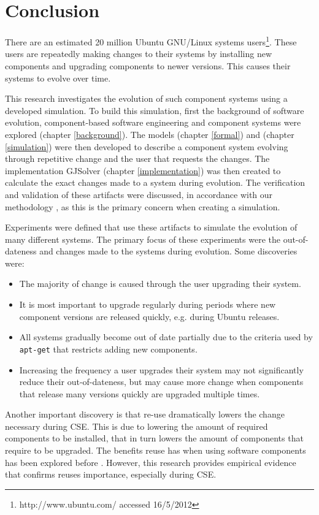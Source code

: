 \chapter{Conclusion}
\label{conclusion}
There are an estimated 20 million Ubuntu GNU/Linux systems users\footnote{http://www.ubuntu.com/ accessed 16/5/2012}.
These users are repeatedly making changes to their systems by installing new components and upgrading components to newer versions.
This causes their systems to evolve over time.

This research investigates the evolution of such component systems using a developed simulation.
To build this simulation, first the background of software evolution, component-based software engineering and component systems were explored (chapter \ref{background}).
The models \modelname (chapter \ref{formal}) and \usermodel (chapter \ref{simulation}) were then developed 
to describe a component system evolving through repetitive change and the user that requests the changes.
The implementation GJSolver (chapter \ref{implementation}) was then created to calculate the exact changes made to a system during evolution.
The verification and validation of these artifacts were discussed, in accordance with our methodology \cite{Law2005}, 
as this is the primary concern when creating a simulation.

Experiments were defined that use these artifacts to simulate the evolution of many different systems.
The primary focus of these experiments were the out-of-dateness and changes made to the systems during evolution.
Some discoveries were:
\begin{itemize}
  \item The majority of change is caused through the user upgrading their system.
  \item It is most important to upgrade regularly during periods where new component versions are released quickly, e.g. during Ubuntu releases.
  \item All systems gradually become out of date partially due to the criteria used by \texttt{apt-get} that restricts adding new components.
  \item Increasing the frequency a user upgrades their system may not significantly reduce their out-of-dateness, 
  but may cause more change when components that release many versions quickly are upgraded multiple times.
\end{itemize} 

Another important discovery is that re-use dramatically lowers the change necessary during CSE.
This is due to lowering the amount of required components to be installed,
that in turn lowers the amount of components that require to be upgraded.
The benefits reuse has when using software components has been explored before \citep{Szyperski2002}.
However, this research provides empirical evidence that confirms reuses importance, especially during CSE.

